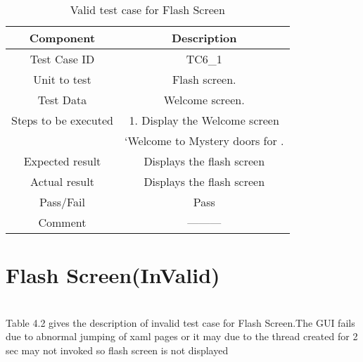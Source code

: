 \begin{table}[htb!]
\label{table : 11}
\centering %
\begin{tabular}{c c} %
\hline\hline %
 Component & Description \\ [0.5ex] %
\hline %
Test Case ID & TC6\_1   \\
Unit to test &Flash screen. \\ 
Test Data &Welcome screen.\\
Steps to be executed &1. Display the Welcome screen\\
& ‘Welcome to Mystery doors for .\\



Expected result  &Displays the flash screen\\ 
Actual result &Displays the flash screen\\
Pass/Fail &Pass\\
Comment &---------\\


\hline %
\end{tabular}
\caption{Valid test case for Flash Screen} \label{table:tc11} %
\end{table}

\section{Flash Screen(InValid)}
\hspace{1cm} \\
Table 4.2 gives the description of invalid test case for Flash Screen.The GUI fails due to abnormal jumping of xaml pages  or it may due to the thread created for 2 sec may not invoked so flash screen is not displayed\\


